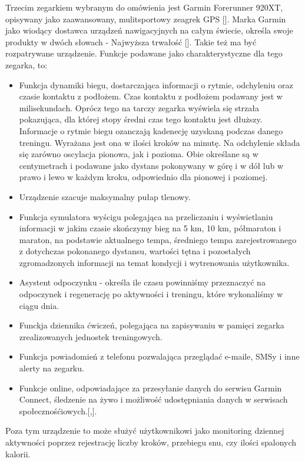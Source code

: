 \documentclass[a4paper,12pt,reqno]{article}
\begin{document}
Trzecim zegarkiem wybranym do omówienia jest Garmin Forerunner 920XT, opisywany jako zaawansowany, mulitsportowy zeagrek GPS []. Marka Garmin jako wiodący dostawca urządzeń nawigacyjnych na całym świecie, określa swoje produkty w dwóch słowach - Najwyższa trwałość []. Takie też ma być rozpatrywane urządzenie. Funkcje podawane jako charakterystyczne dla tego zegarka, to:
\begin{itemize}
	\item Funkcja dynamiki biegu, dostarczająca informacji o rytmie, odchyleniu oraz czasie kontaktu z podłożem. Czas kontaktu z podłożem podawany jest w milisekundach. Oprócz tego na tarczy zegarka wyświela się strzała pokazująca, dla której stopy średni czas tego kontaktu jest dłuższy. Informacje o rytmie biegu ozanczają kadenecję uzyskaną podczas danego treningu. Wyrażana jest ona w ilości kroków na minutę. Na odchylenie składa się zarówno oscylacja pionowa, jak i pozioma. Obie określane są w centymetrach i podawane jako dystans pokonywany w górę i w dół lub w prawo i lewo w każdym kroku, odpowiednio dla pionowej i poziomej.
	\item Urządzenie szacuje maksymalny pułap tlenowy.
	\item Funkcja symulatora wyścigu polegająca na przeliczaniu i wyświetlaniu informacji w jakim czasie skończymy bieg na 5 km, 10 km, półmaraton i maraton, na podstawie aktualnego tempa, średniego tempa zarejestrowanego z dotychczas pokonanego dystansu, wartości tętna i pozostałych zgromadzonych informacji na temat kondycji i wytrenowania użytkownika.
	\item Asystent odpoczynku - określa ile czasu powinniśmy przeznaczyć na odpoczynek i regenerację po aktywności i treningu, które wykonaliśmy w ciągu dnia.
	\item Funckja dziennika ćwiczeń, polegająca na zapisywaniu w pamięci zegarka zrealizowanych jednostek treningowych.
	\item Funkcja powiadomień z telefonu pozwalająca przeglądać e-maile, SMSy i inne alerty na zegarku.
	\item Funkcje online, odpowiadające za przesyłanie danych do serwisu Garmin Connect, śledzenie na żywo i możliwość udostępniania danych w serwisach społecznośćiowych.[,].
\end{itemize}

Poza tym urządzenie to może służyć użytkownikowi jako monitoring dziennej aktywności poprzez rejestrację liczby kroków, przebiegu snu, czy ilości spalonych kalorii.\\
\end{document}
